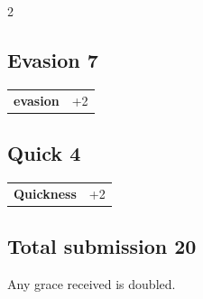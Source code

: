 \begin{multicols}{2}
\begin{tcolorbox}
\vspace{3mm}



\end{tcolorbox}

\begin{tcolorbox}
    \subsection*{Evasion \hfill \small{7 }}
    \tcblower




\begin{tabular}{@{}ll@{}}
    \textbf{evasion} & +2\\
\end{tabular}


\end{tcolorbox}

\begin{tcolorbox}
    \subsection*{Quick \hfill \small{4 }}
    \tcblower




\begin{tabular}{@{}ll@{}}
    \textbf{Quickness} & +2\\
\end{tabular}


\end{tcolorbox}

\begin{tcolorbox}
    \subsection*{Total submission \hfill \small{20 }}
    \tcblower
Any grace received is doubled.


\vspace{3mm}



\end{tcolorbox}
\end{multicols}
